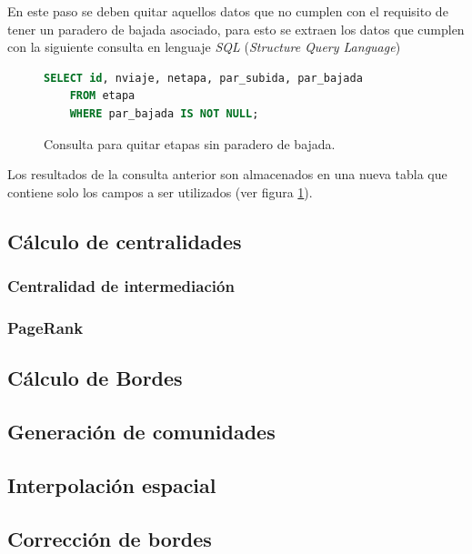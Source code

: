 \documentclass[12pt]{article}
\begin{document}
	En este paso se deben quitar aquellos datos que no cumplen con el requisito de tener un paradero de bajada asociado, para esto se extraen los datos que cumplen con la siguiente consulta en lenguaje \textit{SQL} (\textit{Structure Query Language})
	
\begin{figure}[h]
\begin{center}
\begin{lstlisting}[breaklines=true, language=SQL]
	SELECT id, nviaje, netapa, par_subida, par_bajada 
	FROM etapa 
	WHERE par_bajada IS NOT NULL;
\end{lstlisting}
\end{center}
\caption{Consulta para quitar etapas sin paradero de bajada.}
\label{fig:limpiar_datos}
\end{figure}
	
	Los resultados de la consulta anterior son almacenados en una nueva tabla que contiene solo los campos a ser utilizados (ver figura \ref{fig:limpiar_datos}).
	
	\subsection{Cálculo de centralidades}	
		\subsubsection{Centralidad de intermediación}
		\subsubsection{PageRank}
	
	\subsection{Cálculo de Bordes}
	
	\subsection{Generación de comunidades}
	\subsection{Interpolación espacial}
	
	\subsection{Corrección de bordes}    
    
\end{document}

